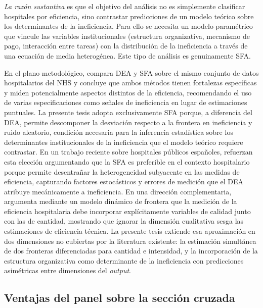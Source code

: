 \textit{La razón sustantiva} es que el objetivo del análisis no es simplemente clasificar hospitales por eficiencia, sino contrastar predicciones de un modelo teórico sobre los determinantes de la ineficiencia. Para ello se necesita un modelo paramétrico que vincule las variables institucionales (estructura organizativa, mecanismo de pago, interacción entre tareas) con la distribución de la ineficiencia a través de una ecuación de media heterogénea. Este tipo de análisis es genuinamente SFA.

En el plano metodológico, \citet{jacobs2001} compara DEA y SFA sobre el mismo conjunto de datos hospitalarios del NHS y concluye que ambos métodos tienen fortalezas específicas y miden potencialmente aspectos distintos de la eficiencia, recomendando el uso de varias especificaciones como señales de ineficiencia en lugar de estimaciones puntuales. La presente tesis adopta exclusivamente SFA porque, a diferencia del DEA, permite descomponer la desviación respecto a la frontera en ineficiencia y ruido aleatorio, condición necesaria para la inferencia estadística sobre los determinantes institucionales de la ineficiencia que el modelo teórico requiere contrastar. En un trabajo reciente sobre hospitales públicos españoles, \citet{arbelo2025unravelling} refuerzan esta elección argumentando que la SFA es preferible en el contexto hospitalario porque permite desentrañar la heterogeneidad subyacente en las medidas de eficiencia, capturando factores estocásticos y errores de medición que el DEA atribuye mecánicamente a ineficiencia. En una dirección complementaria, \citet{prior2006} argumenta mediante un modelo dinámico de frontera que la medición de la eficiencia hospitalaria debe incorporar explícitamente variables de calidad junto con las de cantidad, mostrando que ignorar la dimensión cualitativa sesga las estimaciones de eficiencia técnica. La presente tesis extiende esa aproximación en dos dimensiones no cubiertas por la literatura existente: la estimación simultánea de dos fronteras diferenciadas para cantidad e intensidad, y la incorporación de la estructura organizativa como determinante de la ineficiencia con predicciones asimétricas entre dimensiones del \textit{output}.

\subsection{Ventajas del panel sobre la sección cruzada}


